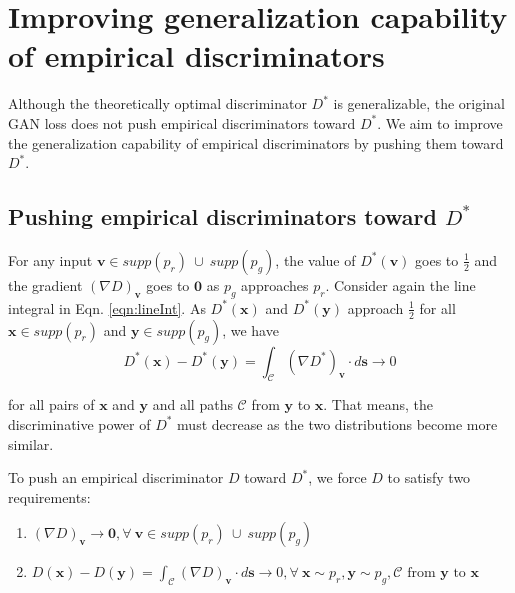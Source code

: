 \documentclass{article} %
\begin{document}
\section{Improving generalization capability of empirical discriminators}
\label{improve}
Although the theoretically optimal discriminator $D^*$ is generalizable, the original GAN loss does not push empirical discriminators toward $D^*$.
We aim to improve the generalization capability of empirical discriminators by pushing them toward $D^*$. %
\subsection{Pushing empirical discriminators toward $D^*$}
For any input $\bm v \in supp(p_r) \ \cup\ supp(p_g)$, the value of $D^*(\bm v)$ goes to $\frac{1}{2}$ and the gradient $(\nabla D)_{\bm v}$ goes to $\bm 0$ as $p_g$ approaches $p_r$. %
Consider again the line integral in Eqn. \ref{eqn:lineInt}. As $D^*(\bm x)$ and $D^*(\bm y)$ approach $\frac{1}{2}$ for all $\bm x \in supp(p_r)$ and $\bm y \in supp(p_g)$, we have
\begin{equation}
 D^*(\bm x) - D^*(\bm y) = \int_{\mathcal{C}}{(\nabla D^*)_{\bm v} \cdot d\bm s} \rightarrow 0 \label{eqn:0lineInt}
\end{equation}

for all pairs of $\bm x$ and $\bm y$ and all paths $\mathcal{C}$ from $\bm y$ to $\bm x$.
That means, the discriminative power of $D^*$ must decrease as the two distributions become more similar.

To push an empirical discriminator $D$ toward $D^*$, we force $D$ to satisfy two requirements:
\begin{enumerate}
\item $(\nabla D)_{\bm v} \rightarrow \bm 0, \forall \ \bm v \in supp(p_r) \ \cup\ supp(p_g)$
\item $D(\bm x) - D(\bm y) = \int_{\mathcal{C}}{(\nabla D)_{\bm v} \cdot d\bm s} \rightarrow 0, \forall \ \bm x \sim p_r, \bm y \sim p_g, \mathcal{C} \text{ from } \bm y \text{ to } \bm x$
\end{enumerate} 
\end{document}
